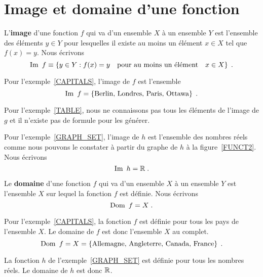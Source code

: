 {\section{Image et domaine d'une fonction}

\begin{focus}{\dfn} 
L'{\bfseries image} d'une fonction $f$ qui va
d'un ensemble $X$ à un ensemble $Y$ est l'ensemble des éléments $y \in Y$
pour lesquelles il existe au moins un élément $x \in X$ tel que
$f(x) = y$.  Nous écrivons
\[
\IM f \equiv \left\{ y \in Y : f(x) = y \quad
\text{pour au moins un élément} \quad x \in X \right\} \; .
\]
\end{focus}

\begin{egg}
Pour l'exemple~\ref{CAPITALS}, l'image de $f$ est l'ensemble
\[
\IM f = \left\{ \text{Berlin, Londres, Paris, Ottawa} \right\} \; .
\]
\end{egg}

\begin{rmk}
Pour l'exemple~\ref{TABLE}, nous ne connaissons pas tous les éléments de
l'image de $g$ et il n'existe pas de formule pour les générer.
\end{rmk}

\begin{egg}
Pour l'exemple~\ref{GRAPH_SET}, l'image de $h$ est l'ensemble des
nombres réels comme nous pouvons le constater à partir du graphe de $h$ à
la figure~\ref{FUNCT2}.  Nous écrivons
\[
\IM h = \RR\; .
\]
\end{egg}

\begin{focus}{\dfn} 
Le {\bfseries domaine} d'une fonction $f$ qui
va d'un ensemble $X$ à un ensemble $Y$ est l'ensemble $X$ sur lequel
la fonction $f$ est définie.  Nous écrivons
\[
\DO f = X \; .
\]
\end{focus}

\begin{egg}
Pour l'exemple~\ref{CAPITALS}, la fonction $f$ est définie pour tous
les pays de l'ensemble $X$.  Le domaine de $f$ est donc l'ensemble
$X$ au complet.
\[
\DO f = X = \left\{ \text{Allemagne, Angleterre, Canada, France}
\right\} \; .
\]
\end{egg}

\begin{egg}
La fonction $h$ de l'exemple~\ref{GRAPH_SET} est définie pour tous les
nombres réels.  Le domaine de $h$ est donc $\mathbb{R}$.
\end{egg}

}
